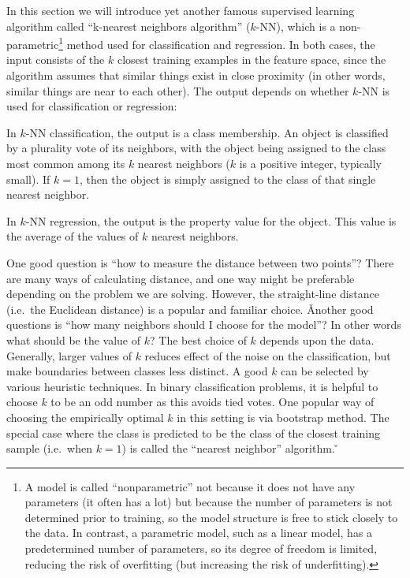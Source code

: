 In this section we will introduce yet another famous supervised learning algorithm called ``k-nearest neighbors
algorithm'' ($k$-NN), which is a non-parametric\footnote{A model is called ``nonparametric'' not because it does not
have any parameters (it often has a lot) but because the number of parameters is not determined prior to training, so
the model structure is free to stick closely to the data. In contrast, a parametric model, such as a linear model,
has a predetermined number of parameters, so its degree of freedom is limited, reducing the risk of overfitting
(but increasing the risk of underfitting).} method used for classification and regression. In both cases, the
input consists of the $k$ closest training examples in the feature space, since the algorithm assumes that similar
things exist in close proximity (in other words, similar things are near to each other). The output depends on
whether $k$-NN is used for classification or regression:
\bit
\item In $k$-NN classification, the output is a class membership. An object is classified by a plurality vote of its
neighbors, with the object being assigned to the class most common among its $k$ nearest neighbors ($k$ is a positive
integer, typically small). If $k = 1$, then the object is simply assigned to the class of that single nearest neighbor.
\item In $k$-NN regression, the output is the property value for the object. This value is the average of the values
of $k$ nearest neighbors.
\eit

One good question is ``how to measure the distance between two points''? There are many ways of calculating
distance, and one way might be preferable depending on the problem we are solving. However, the straight-line
distance (i.e.\ the Euclidean distance) is a popular and familiar choice. \v

Another good questions is ``how many neighbors should I choose for the model''? In other words what should be the
value of $k$? The best choice of $k$ depends upon the data. Generally, larger values of $k$ reduces effect of the
noise on the classification, but make boundaries between classes less distinct. A good $k$ can be selected by various
heuristic techniques. In binary classification problems, it is helpful to choose $k$ to be an odd number as this
avoids tied votes. One popular way of choosing the empirically optimal $k$ in this setting is via bootstrap method.
The special case where the class is predicted to be the class of the closest training sample (i.e.\ when $k = 1$) is
called the ``nearest neighbor'' algorithm. \v

